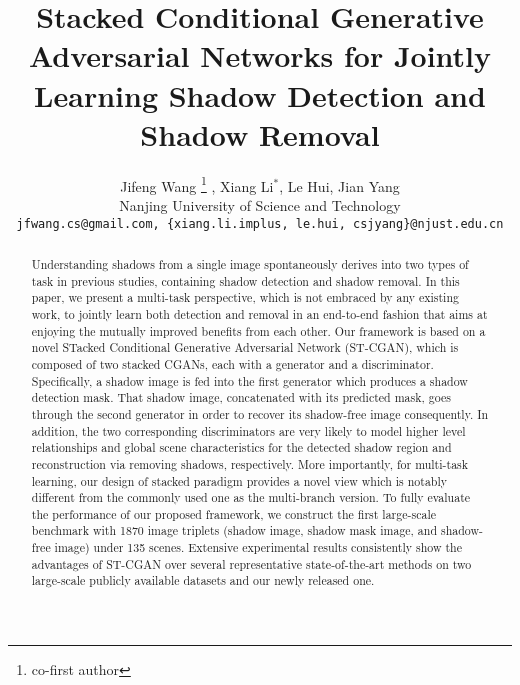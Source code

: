 \documentclass[10pt,twocolumn,letterpaper]{article}
\begin{document}
\title{Stacked Conditional Generative Adversarial Networks for Jointly Learning Shadow Detection and Shadow Removal}
\author{Jifeng Wang \thanks{{co-first author}}
	, Xiang Li$^*$, Le Hui, Jian Yang\\
	Nanjing University of Science and Technology\\
	{\tt\small jfwang.cs@gmail.com, \{xiang.li.implus, le.hui, csjyang\}@njust.edu.cn}
}

\iffalse
\author{First Author\\
Institution1\\
Institution1 address\\
{\tt\small firstauthor@i1.org}
\and
Second Author\\
Institution2\\
First line of institution2 address\\
{\tt\small secondauthor@i2.org}
}
\fi
\maketitle


\begin{abstract}
   Understanding shadows from a single image spontaneously derives into two types of task in previous studies, containing shadow detection and shadow removal. In this paper, we present a multi-task perspective, which is not embraced by any existing work, to jointly learn both detection and removal in an end-to-end fashion that aims at enjoying the mutually improved benefits from each other. Our framework is based on a novel STacked Conditional Generative Adversarial Network (ST-CGAN), which is composed of two stacked CGANs, each with a generator and a discriminator. Specifically, a shadow image is fed into the first generator which produces a shadow detection mask. That shadow image, concatenated with its predicted mask, goes through the second generator in order to recover its shadow-free image consequently. In addition, the two corresponding discriminators are very likely to model higher level relationships and global scene characteristics for the detected shadow region and reconstruction via removing shadows, respectively. More importantly, for multi-task learning, our design of stacked paradigm provides a novel view which is notably different from the commonly used one as the multi-branch version. To fully evaluate the performance of our proposed framework, we construct the first large-scale benchmark with 1870 image triplets (shadow image, shadow mask image, and shadow-free image) under 135 scenes. Extensive experimental results consistently show the advantages of ST-CGAN over several representative state-of-the-art methods on two large-scale publicly available datasets and our newly released one.
\end{abstract}
\end{document}
